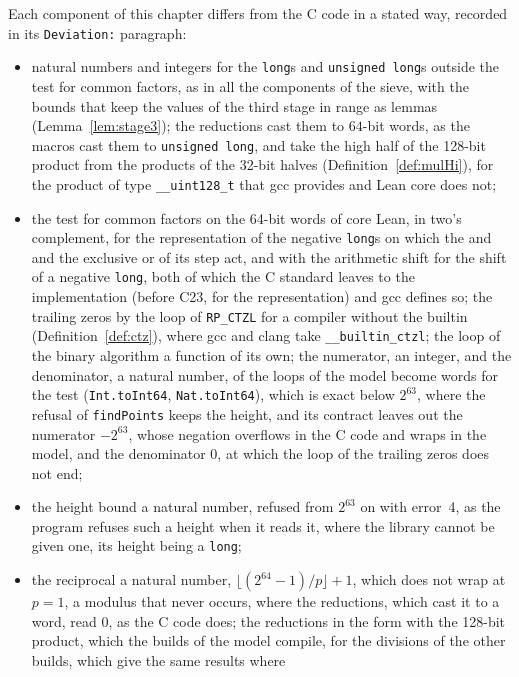 Each component of this chapter differs from the C code in a stated way, recorded in its
\verb|Deviation:| paragraph:
\begin{itemize}
  \item natural numbers and integers for the \verb|long|s and \verb|unsigned long|s outside the test
    for common factors, as in all the components of the sieve, with the bounds that keep the values
    of the third stage in range as lemmas (Lemma~\ref{lem:stage3}); the reductions cast them to
    $64$-bit words, as the macros cast them to \verb|unsigned long|, and take the high half of the
    128-bit product from the products of the 32-bit halves (Definition~\ref{def:mulHi}), for the
    product of type \verb|__uint128_t| that gcc provides and Lean core does not;
  \item the test for common factors on the 64-bit words of core Lean, in two's complement, for the
    representation of the negative \verb|long|s on which the and and the exclusive or of its step
    act, and with the arithmetic shift for the shift of a negative \verb|long|, both of which the C
    standard leaves to the implementation (before C23, for the representation) and gcc defines so;
    the trailing zeros by the loop of \verb|RP_CTZL| for a compiler without the builtin
    (Definition~\ref{def:ctz}), where gcc and clang take \verb|__builtin_ctzl|; the loop of the
    binary algorithm a function of its own; the numerator, an integer, and the denominator, a
    natural number, of the loops of the model become words for the test (\verb|Int.toInt64|,
    \verb|Nat.toInt64|), which is exact below $2^{63}$, where the refusal of
    \verb|findPoints| keeps the height, and its contract leaves out the numerator $-2^{63}$, whose
    negation overflows in the C code and wraps in the model, and the denominator $0$, at which the
    loop of the trailing zeros does not end;
  \item the height bound a natural number, refused from $2^{63}$ on with error~4, as the program
    refuses such a height when it reads it, where the library cannot be given one, its height being
    a \verb|long|;
  \item the reciprocal a natural number, $\lfloor (2^{64} - 1) / p \rfloor + 1$, which does not wrap
    at $p = 1$, a modulus that never occurs, where the reductions, which cast it to a word, read
    $0$, as the C code does; the reductions in the form with the 128-bit product, which the builds
    of the model compile, for the divisions of the other builds, which give the same results where

\end{itemize}
